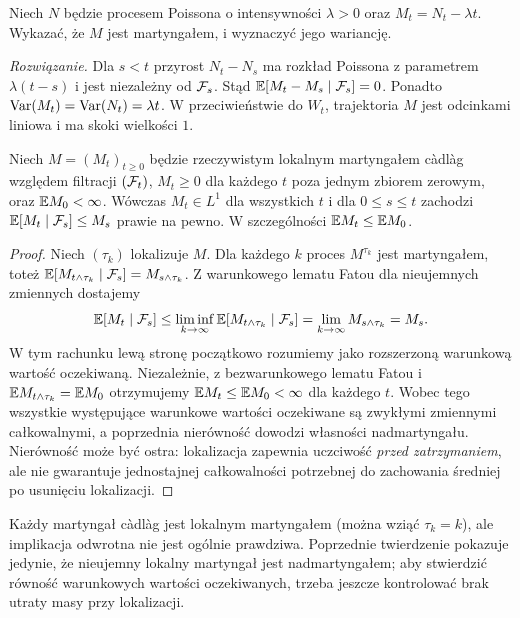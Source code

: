 \begin{zadanie}
Niech $N$ będzie procesem Poissona o intensywności
$\lambda>0$ oraz $M_t=N_t-\lambda t$. Wykazać,
że $M$ jest martyngałem, i wyznaczyć jego wariancję.

\emph{Rozwiązanie.} Dla $s<t$ przyrost
$N_t-N_s$ ma rozkład Poissona z parametrem
$\lambda(t-s)$ i jest niezależny od $\mathcal{F}_s$.
Stąd $\mathbb{E}[M_t-M_s\mid\mathcal{F}_s]=0$. Ponadto
$\operatorname{Var}(M_t)=\operatorname{Var}(N_t)=\lambda t$.
W przeciwieństwie do $W_t$, trajektoria $M$ jest
odcinkami liniowa i ma skoki wielkości $1$.
\end{zadanie}


\begin{twierdzenie}
\label{thm:positive-local-supermart}
Niech $M=(M_t)_{t\ge0}$ będzie rzeczywistym lokalnym
martyngałem c\`adl\`ag względem filtracji $(\mathcal{F}_t)$,
$M_t\ge0$ dla każdego $t$ poza jednym zbiorem zerowym,
oraz $\mathbb{E} M_0<\infty$. Wówczas $M_t\in L^1$ dla wszystkich $t$
i dla $0\le s\le t$ zachodzi
$\mathbb{E}[M_t\mid\mathcal{F}_s]\le M_s$ prawie na pewno.
W szczególności $\mathbb{E} M_t\le\mathbb{E} M_0$.
\end{twierdzenie}
\begin{proof}
Niech $(\tau_k)$ lokalizuje $M$. Dla każdego $k$ proces
$M^{\tau_k}$ jest martyngałem, toteż
$\mathbb{E}[M_{t\wedge\tau_k}\mid\mathcal{F}_s]=M_{s\wedge\tau_k}$.
Z warunkowego lematu Fatou dla nieujemnych zmiennych dostajemy
\[
\mathbb{E}[M_t\mid\mathcal{F}_s]
\le\liminf_{k\to\infty}\mathbb{E}[M_{t\wedge\tau_k}\mid\mathcal{F}_s]
=\lim_{k\to\infty}M_{s\wedge\tau_k}=M_s.
\]
W tym rachunku lewą stronę początkowo rozumiemy jako rozszerzoną
warunkową wartość oczekiwaną. Niezależnie, z bezwarunkowego
lematu Fatou i $\mathbb{E} M_{t\wedge\tau_k}=\mathbb{E} M_0$ otrzymujemy
$\mathbb{E} M_t\le\mathbb{E} M_0<\infty$ dla każdego $t$.
Wobec tego wszystkie występujące warunkowe wartości
oczekiwane są zwykłymi zmiennymi całkowalnymi, a poprzednia
nierówność dowodzi własności nadmartyngału.
Nierówność może być ostra: lokalizacja zapewnia uczciwość
\emph{przed zatrzymaniem}, ale nie gwarantuje jednostajnej
całkowalności potrzebnej do zachowania średniej po usunięciu
lokalizacji.
\end{proof}

\begin{uwaga}
Każdy martyngał c\`adl\`ag jest lokalnym martyngałem
(można wziąć $\tau_k=k$), ale implikacja odwrotna nie jest
ogólnie prawdziwa. Poprzednie twierdzenie pokazuje jedynie,
że nieujemny lokalny martyngał jest nadmartyngałem;
aby stwierdzić równość warunkowych wartości oczekiwanych,
trzeba jeszcze kontrolować brak utraty masy przy lokalizacji.
\end{uwaga}


